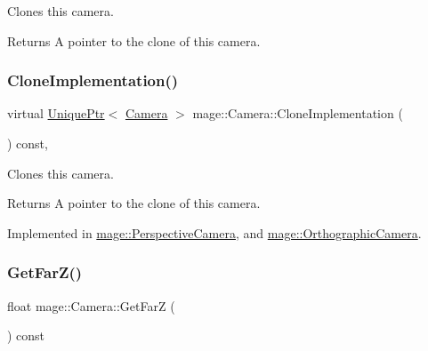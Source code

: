 Clones this camera.

\begin{DoxyReturn}{Returns}
A pointer to the clone of this camera. 
\end{DoxyReturn}
\hypertarget{classmage_1_1_camera_aedf6e7d6ee6c6e9e82da814ef8e705ab}{}\label{classmage_1_1_camera_aedf6e7d6ee6c6e9e82da814ef8e705ab} 
\subsubsection{\texorpdfstring{Clone\+Implementation()}{CloneImplementation()}}
{\footnotesize\ttfamily virtual \hyperlink{namespacemage_a8c307fbcc33bce9b7f2aa4c26c3b95cf}{Unique\+Ptr}$<$ \hyperlink{classmage_1_1_camera}{Camera} $>$ mage\+::\+Camera\+::\+Clone\+Implementation (\begin{DoxyParamCaption}{ }\end{DoxyParamCaption}) const\hspace{0.3cm}{\ttfamily [private]}, {}}

Clones this camera.

\begin{DoxyReturn}{Returns}
A pointer to the clone of this camera. 
\end{DoxyReturn}


Implemented in \hyperlink{classmage_1_1_perspective_camera_aa597ab884256b7e6fad63653af3ac789}{mage\+::\+Perspective\+Camera}, and \hyperlink{classmage_1_1_orthographic_camera_aeef89cff8f4272b1412fa3ce366e656d}{mage\+::\+Orthographic\+Camera}.

\hypertarget{classmage_1_1_camera_ac4c8e8bbfb16068ab24a90e4a4788d15}{}\label{classmage_1_1_camera_ac4c8e8bbfb16068ab24a90e4a4788d15} 
\subsubsection{\texorpdfstring{Get\+Far\+Z()}{GetFarZ()}}
{\footnotesize\ttfamily float mage\+::\+Camera\+::\+Get\+FarZ (\begin{DoxyParamCaption}{ }\end{DoxyParamCaption}) const\hspace{0.3cm}{\ttfamily [noexcept]}}

